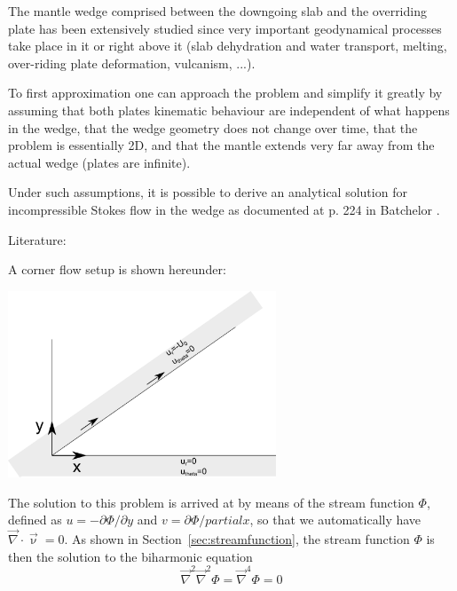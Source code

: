 The mantle wedge comprised between the downgoing slab and the overriding plate
has been extensively studied since very important geodynamical processes take place
in it or right above it (slab dehydration and water transport, melting, over-riding plate
deformation, vulcanism, ...).

To first approximation one can approach the problem and simplify it greatly by 
assuming that both plates kinematic behaviour are independent of what happens 
in the wedge, that the wedge geometry does not change over time, that the problem 
is essentially 2D, and that the mantle extends very far away from the actual 
wedge (plates are infinite). 

Under such assumptions, it is possible to derive an analytical solution 
for incompressible Stokes flow in the wedge as documented at p. 224 in  Batchelor \cite{batchelor}.

Literature: \cite{tosl78}


A corner flow setup is shown hereunder:
\begin{center}
\includegraphics[width=8cm]{images/cornerflow/corner}
\end{center}

 
The solution to this problem is arrived at by means of the stream function $\Phi$, defined 
as $u=-\partial \Phi/\partial y$ and $v=\partial \Phi/partial x$, so that we automatically have $\vec\nabla\cdot\vec\upnu=0$.
As shown in Section~\ref{sec:streamfunction}, the stream function $\Phi$ is then the solution to 
the biharmonic equation
\[
\vec\nabla^2 \vec\nabla^2 \Phi = \vec\nabla^4 \Phi = 0
\]

